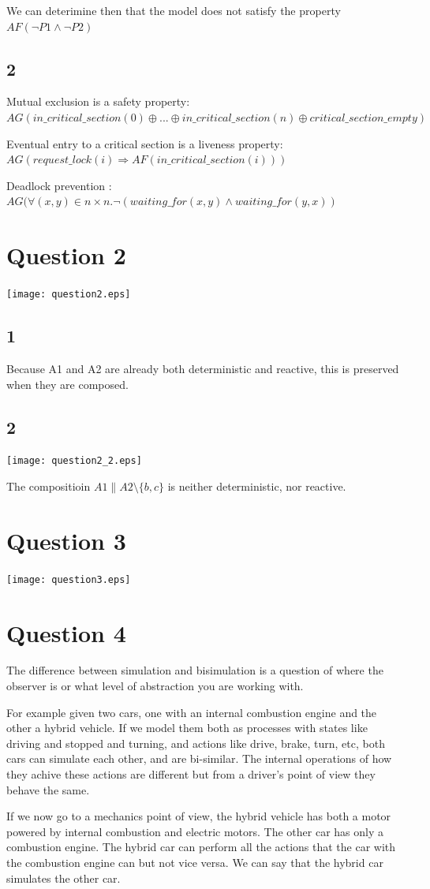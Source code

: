 \documentclass{scrartcl}
\begin{document}
We can deterimine then that the model does not satisfy the property $AF(\neg P1 \wedge \neg P2)$

\subsection{2}
Mutual exclusion is a safety property: 
$AG(in\_critical\_section(0)  \oplus ...\oplus in\_critical\_section(n) \oplus critical\_section\_empty)$

Eventual entry to a critical section is a liveness property: $AG(request\_lock(i) \Rightarrow AF(in\_critical\_section(i)))$

Deadlock prevention : $AG(\forall (x, y) \in n \times n. \neg (waiting\_for(x, y) \wedge waiting\_for(y, x))$

\section{Question 2}
\texttt{[image: question2.eps]}
\subsection{1}
Because A1 and A2 are already both deterministic and reactive, this is preserved when they are composed.
\subsection{2}
\texttt{[image: question2\_2.eps]}

The compositioin $A1 \| A2 \setminus \{b, c\}$ is neither deterministic, nor reactive.
\section{Question 3}
\texttt{[image: question3.eps]}
\section{Question 4}
The difference between simulation and bisimulation is a question of where the observer is or what level of abstraction you are working with.

For example given two cars, one with an internal combustion engine and the other a hybrid vehicle. If we model them both as processes with states like driving and stopped and turning, and actions like drive, brake, turn, etc, both cars can simulate each other, and are bi-similar. The internal operations of how they achive these actions are different but from a driver's point of view they behave the same.

If we now go to a mechanics point of view, the hybrid vehicle has both a motor powered by internal combustion and electric motors. The other car has only a combustion engine. The hybrid car can perform all the actions that the car with the combustion engine can but not vice versa. We can say that the hybrid car simulates the other car.
\end{document}
